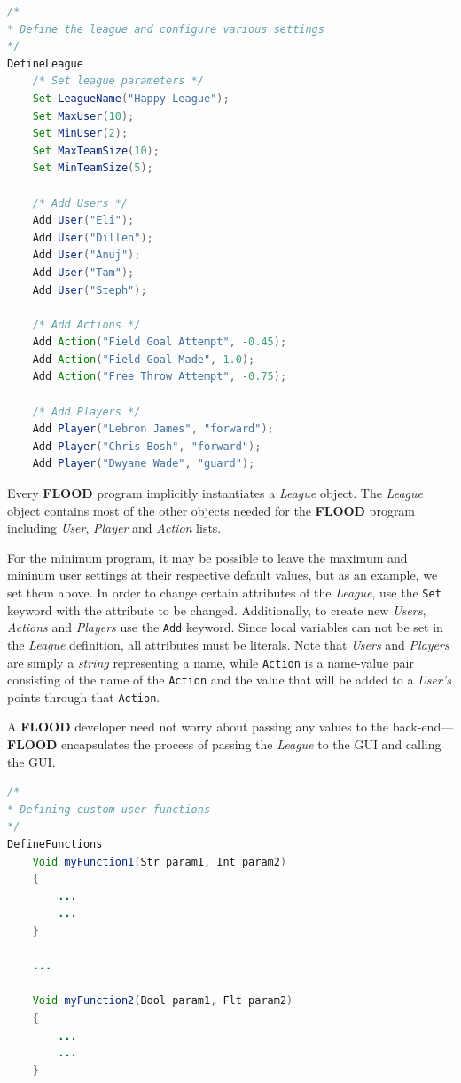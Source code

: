 \documentclass[12pt]{report}
\begin{document}
\begin{singlespace}
\begin{lstlisting}[language=Java,label=some-code,caption={Defining the league and setting parameters.}]
/*
* Define the league and configure various settings
*/
DefineLeague
	/* Set league parameters */
	Set LeagueName("Happy League");
	Set MaxUser(10);
	Set MinUser(2);
	Set MaxTeamSize(10);
	Set MinTeamSize(5);
	
	/* Add Users */
	Add User("Eli");
	Add User("Dillen");
	Add User("Anuj");
	Add User("Tam");
	Add User("Steph");

	/* Add Actions */
	Add Action("Field Goal Attempt", -0.45);
	Add Action("Field Goal Made", 1.0);
	Add Action("Free Throw Attempt", -0.75);

	/* Add Players */
	Add Player("Lebron James", "forward");
	Add Player("Chris Bosh", "forward");
	Add Player("Dwyane Wade", "guard");
\end{lstlisting}
\end{singlespace}

Every \textbf{FLOOD} program implicitly instantiates a \textit{League} object. The \textit{League} object contains most of the other objects needed for the \textbf{FLOOD} program including \textit{User}, \textit{Player} and \textit{Action} lists.

For the minimum program, it may be possible to leave the maximum and mininum user settings at their respective default values, but as an example, we set them above. In order to change certain attributes of the \textit{League}, use the \texttt{Set} keyword with the attribute to be changed. Additionally, to create new \textit{Users}, \textit{Actions} and \textit{Players} use the \texttt{Add} keyword. Since local variables can not be set in the \textit{League} definition, all attributes must be literals. Note that \textit{Users} and \textit{Players} are simply a \textit{string} representing a name, while \texttt{Action} is a name-value pair consisting of the name of the \texttt{Action} and the value that will be added to a \textit{User's} points through that \texttt{Action}.

A \textbf{FLOOD} developer need not worry about passing any values to the back-end---\textbf{FLOOD} encapsulates the process of passing the \textit{League} to the GUI and calling the GUI.

\begin{singlespace}
\begin{lstlisting}[language=Java,label=some-code,caption={Defining functions.}]
/*
* Defining custom user functions
*/
DefineFunctions
	Void myFunction1(Str param1, Int param2)
	{
		...
		...
	}

	...

	Void myFunction2(Bool param1, Flt param2)
	{
		...
		...
	}
\end{lstlisting}
\end{singlespace}
\end{document}
